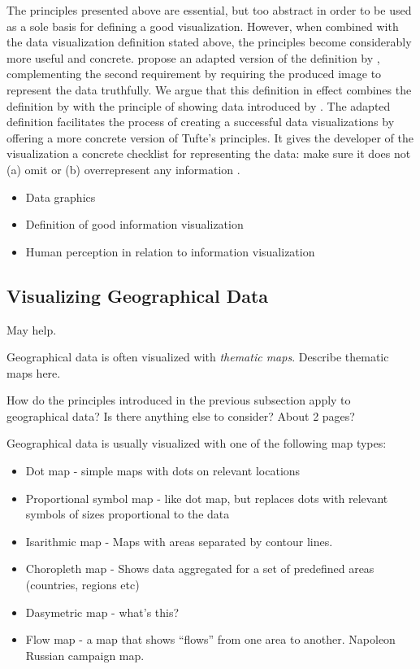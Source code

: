 The principles presented above are essential, but too abstract in order to be used as a sole basis for defining a good visualization. However, when combined with the data visualization definition stated above, the principles become considerably more useful and concrete. \citet{azzam_j-b_2013} propose an adapted version of the definition by \citet{kosara_visualization_2007}, complementing the second requirement by requiring the produced image to represent the data truthfully. We argue that this definition in effect combines the definition by \citet{kosara_visualization_2007} with the principle of showing data introduced by \citet{tufte_visual_1986}. The adapted definition facilitates the process of creating a successful data visualizations by offering a more concrete version of Tufte's principles. It gives the developer of the visualization a concrete checklist for representing the data: make sure it does not (a) omit or (b)  overrepresent any information \citep{azzam_j-b_2013}.



\begin{itemize}
\item Data graphics
\item Definition of good information visualization
\item Human perception in relation to information visualization
\end{itemize}

\subsection{Visualizing Geographical Data}

\citet[p. ~16]{tufte_visual_1986} May help.

Geographical data is often visualized with \emph{thematic maps}. Describe thematic maps here.

How do the principles introduced in the previous subsection apply to geographical data? Is there anything else to consider? About 2 pages?

Geographical data is usually visualized with one of the following map types:
\begin{itemize}
  \item Dot map - simple maps with dots on relevant locations
  \item Proportional symbol map - like dot map, but replaces dots with relevant symbols of sizes proportional to the data
  \item Isarithmic map - Maps with areas separated by contour lines.
  \item Choropleth map - Shows data aggregated for a set of predefined areas (countries, regions etc)
  \item Dasymetric map - what's this?
  \item Flow map - a map that shows ``flows'' from one area to another. Napoleon Russian campaign map.
\end{itemize}

